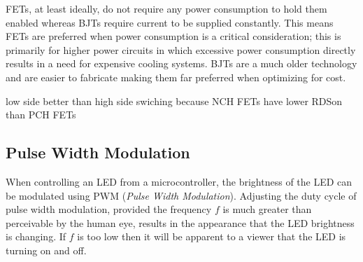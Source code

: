 \documentclass[main.tex]{subfiles}
\begin{document}
FETs, at least ideally, do not require any power consumption to hold them enabled whereas BJTs require current to be supplied constantly. This means FETs are preferred when power consumption is a critical consideration; this is primarily for higher power circuits in which excessive power consumption directly results in a need for expensive cooling systems. BJTs are a much older technology and are easier to fabricate making them far preferred when optimizing for cost.

low side better than high side swiching because NCH FETs have lower RDSon than PCH FETs 

\subsection{Pulse Width Modulation}
When controlling an LED from a microcontroller, the brightness of the LED can be modulated using PWM (\textit{Pulse Width Modulation}). Adjusting the duty cycle of pulse width modulation, provided the frequency $f$ is much greater than perceivable by the human eye, results in the appearance that the LED brightness is changing. If $f$ is too low then it will be apparent to a viewer that the LED is turning on and off.

\end{document}
